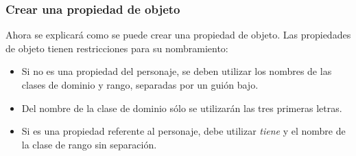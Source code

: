 \subsubsection{Crear una propiedad de objeto}\label{CreateObjProp}
Ahora se explicará como se puede crear una propiedad de objeto. Las propiedades de objeto tienen restricciones para su nombramiento:
\begin{itemize}
    \item Si no es una propiedad del personaje, se deben utilizar los nombres de las clases de dominio y rango, 
    separadas por un guión bajo.
    \item Del nombre de la clase de dominio sólo se utilizarán las tres primeras letras.
    \item Si es una propiedad referente al personaje, debe utilizar \textit{tiene} y el nombre de la clase de rango sin separación.
\end{itemize}

